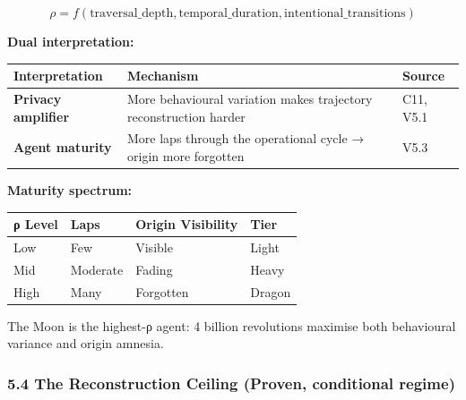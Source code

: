 \documentclass[
  11pt,
]{article}
\newcounter{none} %
\begin{document}
\[\rho = f(\text{traversal\_depth}, \text{temporal\_duration}, \text{intentional\_transitions})\]

\textbf{Dual interpretation:}

{\def\LTcaptype{none} %
\begin{longtable}[]{@{}
  >{\raggedright\arraybackslash}p{}
  >{\raggedright\arraybackslash}p{}
  >{\raggedright\arraybackslash}p{}@{}}
\toprule\noalign{}
\begin{minipage}[b]{\linewidth}\raggedright
Interpretation
\end{minipage} & \begin{minipage}[b]{\linewidth}\raggedright
Mechanism
\end{minipage} & \begin{minipage}[b]{\linewidth}\raggedright
Source
\end{minipage} \\
\midrule\noalign{}
\endhead
\bottomrule\noalign{}
\endlastfoot
\textbf{Privacy amplifier} & More behavioural variation makes trajectory
reconstruction harder & C11, V5.1 \\
\textbf{Agent maturity} & More laps through the operational cycle →
origin more forgotten & V5.3 \\
\end{longtable}
}

\textbf{Maturity spectrum:}

{\def\LTcaptype{none} %
\begin{longtable}[]{@{}llll@{}}
\toprule\noalign{}
ρ Level & Laps & Origin Visibility & Tier \\
\midrule\noalign{}
\endhead
\bottomrule\noalign{}
\endlastfoot
Low & Few & Visible & Light \\
Mid & Moderate & Fading & Heavy \\
High & Many & Forgotten & Dragon \\
\end{longtable}
}

The Moon is the highest-ρ agent: 4 billion revolutions maximise both
behavioural variance and origin amnesia.

\subsubsection{5.4 The Reconstruction Ceiling (Proven, conditional
regime)}\label{the-reconstruction-ceiling-proven-conditional-regime}
\end{document}
